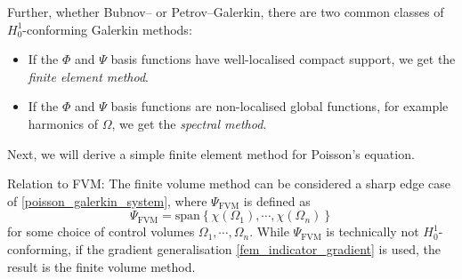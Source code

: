 Further, whether Bubnov-- or Petrov--Galerkin, there are two common classes of $H^1_0$-conforming Galerkin methods:
\begin{itemize}
    \item If the $\Phi$ and $\Psi$ basis functions have well-localised compact support, we get the \textit{finite element method}.
    \item If the $\Phi$ and $\Psi$ basis functions are non-localised global functions, for example harmonics of $\Omega$, we get the \textit{spectral method}.
\end{itemize}
Next, we will derive a simple finite element method for Poisson's equation.

\begin{aside}
Relation to FVM: The finite volume method can be considered a sharp edge case of \eqref{poisson_galerkin_system}, where $\Psi_{\text{FVM}}$ is defined as
$$
    \Psi_{\text{FVM}} = \text{span}\left\{\chi(\Omega_1), \cdots, \chi(\Omega_n)\right\}
$$
for some choice of control volumes $\Omega_1, \cdots, \Omega_n$.
While $\Psi_{\text{FVM}}$ is technically not $H^1_0$-conforming, if the gradient generalisation \eqref{fem_indicator_gradient} is used, the result is the finite volume method.
\end{aside}






